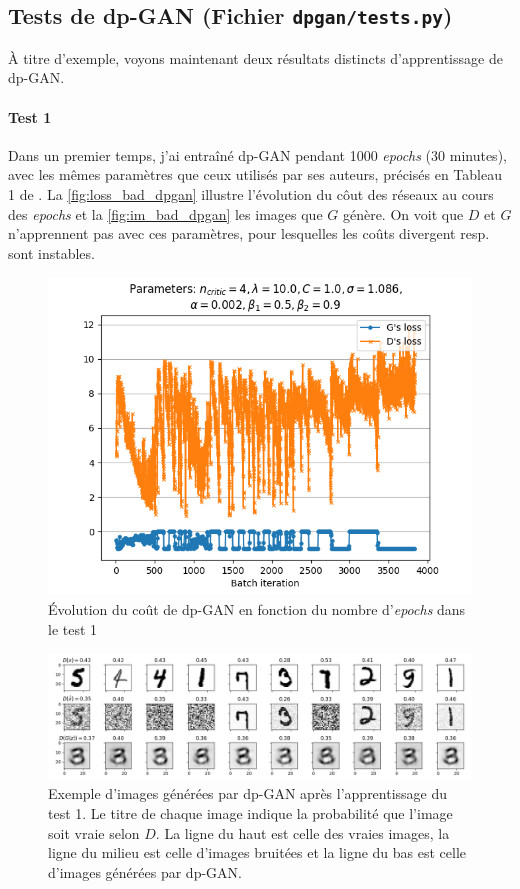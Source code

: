 \documentclass[a4paper,11pt,twoside]{article}
\theoremstyle{definition}
\begin{document}
\subsection{Tests de dp-GAN {\normalfont(Fichier \texttt{dpgan/tests.py})}}
À titre d'exemple, voyons maintenant deux résultats distincts d'apprentissage de dp-GAN.

\paragraph{Test 1}
Dans un premier temps, j'ai entraîné dp-GAN pendant 1000 \textit{epochs} (30 minutes), avec les mêmes paramètres que ceux utilisés par ses auteurs, précisés en Tableau 1 de \cite{dpgan}. La \autoref{fig:loss_bad_dpgan} illustre l'évolution du côut des réseaux au cours des \textit{epochs} et la \autoref{fig:im_bad_dpgan} les images que $G$ génère. On voit que $D$ et $G$ n'apprennent pas avec ces paramètres, pour lesquelles les coûts divergent resp. sont instables.

\begin{figure}
    \includegraphics[width=0.6\linewidth]{test1loss.png}
    \caption{Évolution du coût de dp-GAN en fonction du nombre d'\textit{epochs} dans le test 1}
    \label{fig:loss_bad_dpgan}
\end{figure}

\begin{figure}
    \includegraphics[width=\linewidth]{test1im.png}
    \caption{Exemple d'images générées par dp-GAN après l'apprentissage du test 1. Le titre de chaque image indique la probabilité que l'image soit vraie selon $D$. La ligne du haut est celle des vraies images, la ligne du milieu est celle d'images bruitées et la ligne du bas est celle d'images générées par dp-GAN.}
    \label{fig:im_bad_dpgan}
\end{figure}
\end{document}
